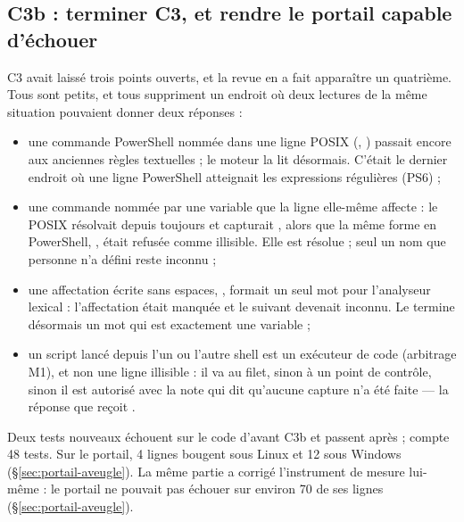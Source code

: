 \subsection{C3b : terminer C3, et rendre le portail capable d'échouer}
\label{sec:c3b}
C3 avait laissé trois points ouverts, et la revue en a fait apparaître un quatrième. Tous sont
petits, et tous suppriment un endroit où deux lectures de la même situation pouvaient donner deux
réponses :
\begin{itemize}
  \item une commande PowerShell nommée dans une ligne POSIX (,
    ) passait encore aux anciennes règles textuelles ; le moteur la lit
    désormais. C'était le dernier endroit où une ligne PowerShell atteignait les expressions
    régulières (PS6) ;
  \item une commande nommée par une variable que la ligne elle-même affecte : le POSIX
    résolvait depuis toujours  et capturait , alors que la même
    forme en PowerShell, , était refusée comme illisible.
    Elle est résolue ; seul un nom que personne n'a défini reste inconnu ;
  \item une affectation écrite sans espaces, , formait un seul mot pour
    l'analyseur lexical : l'affectation était manquée et le  suivant devenait inconnu.
    Le \cmd{=} termine désormais un mot qui est exactement une variable ;
  \item un script  lancé depuis l'un ou l'autre shell est un exécuteur de code
    (arbitrage M1), et non une ligne illisible : il va au filet, sinon à un point de contrôle,
    sinon il est autorisé avec la note qui dit qu'aucune capture n'a été faite --- la réponse que
    reçoit .
\end{itemize}
Deux tests nouveaux échouent sur le code d'avant C3b et passent après ; 
compte 48 tests. Sur le portail, 4 lignes bougent sous Linux et 12 sous Windows
(§\ref{sec:portail-aveugle}). La même partie a corrigé l'instrument de mesure lui-même : le
portail ne pouvait pas échouer sur environ 70 de ses lignes (§\ref{sec:portail-aveugle}).
